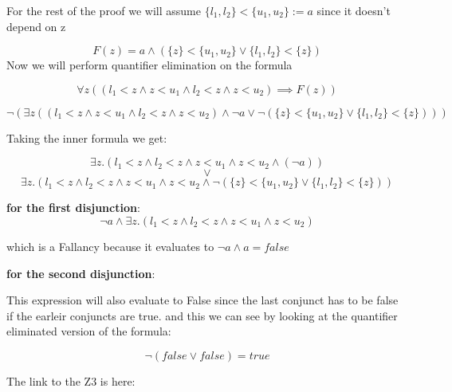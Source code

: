 \documentclass{article}
\begin{document}
\begin{enumerate}[label=(\alph*)]
        For the rest of the proof we will assume $\{l_1,l_2\} < \{u_1,u_2 \} := a$ since it doesn't depend on z

        $$F(z) = a \land (\{z\} < \{u_1, u_2\} \lor \{l_1,l_2\} < \{z\})$$
     Now we will perform quantifier elimination on the formula 

     $$\forall z ((l_1 < z \land z < u_1 \land l_2 < z \land z < u_2) \implies F(z) ) $$

     $$\neg( \exists z ((l_1 < z \land z < u_1 \land l_2 < z \land z < u_2) \land \neg a \lor \neg(\{z\} < \{u_1, u_2\} \lor \{l_1,l_2\} < \{z\}) )) $$

     Taking the inner formula we get:

     $$\exists z. (l_1 < z \land l_2 < z \land z < u_1 \land z < u_2 \land (\neg a))$$
     $$\lor$$
     $$ \exists z. (l_1 < z \land l_2 < z \land z < u_1 \land z < u_2 \land \neg(\{z\} < \{u_1, u_2\} \lor \{l_1,l_2\} < \{z\}))$$

     \textbf{for the first disjunction}:
     $$\neg a \land \exists z. (l_1 < z \land l_2 < z \land z < u_1 \land z < u_2)$$

     which is a Fallancy because it evaluates to $\neg a \land a = false$

     \textbf{for the second disjunction}:

     This expression will also evaluate to False since the last conjunct has to be false if the earleir conjuncts are true. and this we can see by looking at the quantifier eliminated version of the formula:

     $$\neg (false \lor false) = true$$

     The link to the Z3 is here:


     
\end{enumerate}
\end{document}
